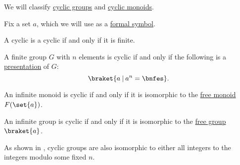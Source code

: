 \begin{proposition}\label{thm:cyclic_monoid_classification}
  We will classify \hyperref[def:cyclic_group]{cyclic groups} and \hyperref[def:cyclic_monoid]{cyclic monoids}.

  Fix a set \( a \), which we will use as a \hyperref[def:formal_language/symbol]{formal symbol}.

  \begin{thmenum}
     A cyclic  is a cyclic  if and only if it is finite.

     A finite group \( G \) with \( n \) elements is cyclic if and only if the following is a \hyperref[def:group_presentation]{presentation} of \( G \):
    \begin{equation}\label{eq:thm:cyclic_monoid_classification/finite_group}
      \braket{ a \given a^n = \bnfes }.
    \end{equation}

     An infinite monoid is cyclic if and only if it is isomorphic to the \hyperref[def:free_monoid]{free monoid} \( F(\set{ a }) \).

     An infinite group is cyclic if and only if it is isomorphic to the \hyperref[def:free_group]{free group} \( \braket{ a } \).
  \end{thmenum}
\end{proposition}
\begin{comments}
  \item As shown in , cyclic groups are also isomorphic to either all integers to the integers modulo some fixed \( n \).
\end{comments}
